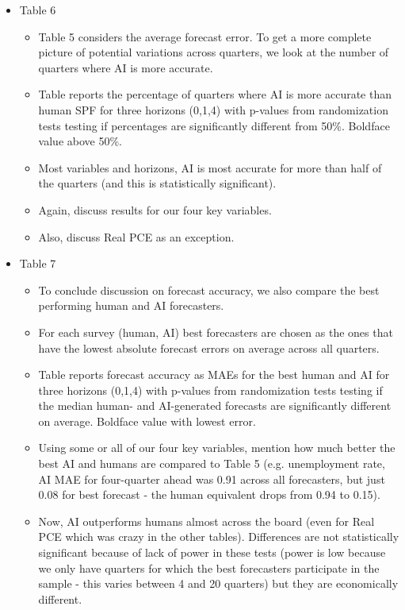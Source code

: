 \documentclass{article}
\begin{document}
\begin{itemize}
\begin{itemize}
        \end{itemize}
    \item Table 6
        \begin{itemize}
            \item Table 5 considers the average forecast error. To get a more complete picture of potential variations across quarters, we look at the number of quarters where AI is more accurate. 
            \item Table reports the percentage of quarters where AI is more accurate than human SPF for three horizons (0,1,4) with p-values from randomization tests testing if percentages are significantly different from 50\%. Boldface value above 50\%.
            \item Most variables and horizons, AI is most accurate for more than half of the quarters (and this is statistically significant).
            \item Again, discuss results for our four key variables.
            \item Also, discuss Real PCE as an exception. 
        \end{itemize}
    \item Table 7
        \begin{itemize}
            \item To conclude discussion on forecast accuracy, we also compare the best performing human and AI forecasters.
            \item For each survey (human, AI) best forecasters are chosen as the ones that have the lowest absolute forecast errors on average across all quarters.
            \item Table reports forecast accuracy as MAEs for the best human and AI for three horizons (0,1,4) with p-values from randomization tests testing if the median human- and AI-generated forecasts are significantly different on average. Boldface value with lowest error.
            \item Using some or all of our four key variables, mention how much better the best AI and humans are compared to Table 5 (e.g. unemployment rate, AI MAE for four-quarter ahead was 0.91 across all forecasters, but just 0.08 for best forecast - the human equivalent drops from 0.94 to 0.15).
            \item Now, AI outperforms humans almost across the board (even for Real PCE which was crazy in the other tables). Differences are not statistically significant because of lack of power in these tests (power is low because we only have quarters for which the best forecasters participate in the sample - this varies between 4 and 20 quarters) but they are economically different. 

\end{itemize}
\end{itemize}
\end{document}
